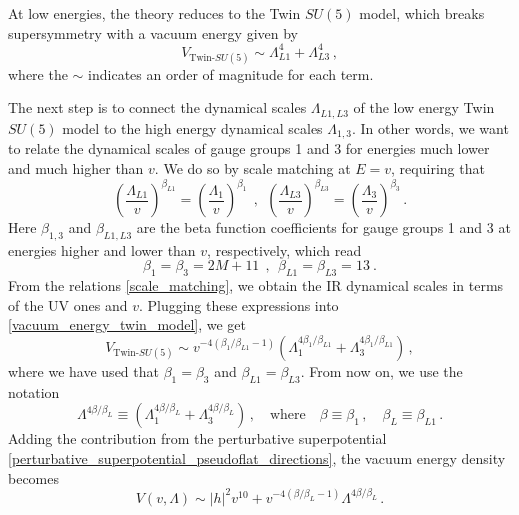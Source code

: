 \documentclass[a4paper,12pt]{article}
\begin{document}
{At low energies, the theory reduces to the Twin $SU(5)$ model, which breaks supersymmetry with a vacuum energy given by 
\begin{equation}
	V_{\text{Twin-}SU(5)} \sim \Lambda_{L1}^4 + \Lambda_{L3}^4 \, ,
\label{vacuum_energy_twin_model}
\end{equation}
where the $\sim$ indicates an order of magnitude for each term.

The next step is to connect the dynamical scales $\Lambda_{L1,L3}$ of the low energy Twin $SU(5)$ model to the high energy dynamical scales 
$\Lambda_{1,3}$. In other words, we want to relate the dynamical scales of gauge groups 1 and 3 for energies much lower and much higher than $v$. We do so by scale matching at $E=v$, requiring that
\begin{equation}
	\left(\frac{\Lambda_{L1}}{v}\right)^{\beta_{L1}} =	\left(\frac{\Lambda_{1}}{v}\right)^{\beta_1} ~~,~~\left(\frac{\Lambda_{L3}}{v}\right)^{\beta_{L3}} =	\left(\frac{\Lambda_{3}}{v}\right)^{\beta_3}  \, .
\label{scale_matching}
\end{equation}
Here $\beta_{1,3}$ and $\beta_{L1,L3}$ are the beta function coefficients for gauge groups 1 and 3 at energies higher and lower than $v$, respectively,  
which read
\begin{equation}
\beta_{1} = \beta_{3} = 2M + 11~~,~~ \beta_{L1} = \beta_{L3} = 13~.
\end{equation}
From the relations \eqref{scale_matching}, we obtain the IR dynamical scales in terms of the UV ones and $v$. Plugging these expressions into \eqref{vacuum_energy_twin_model}, we get
\begin{equation}
	V_{\text{Twin-}SU(5)} \sim v^{-4(\beta_1/\beta_{L1} - 1)}\left(\Lambda^{4\beta_1 / \beta_{L1}}_1 + \Lambda^{4\beta_1 / \beta_{L1}}_3\right)\, ,
\end{equation}
where we have used that $\beta_1=\beta_3$ and $\beta_{L1}=\beta_{L3}$. From now on, we use the notation
\begin{equation}
\Lambda^{4\beta / \beta_{L}} \equiv	\left(\Lambda^{4\beta / \beta_{L}}_1 + \Lambda^{4\beta / \beta_{L}}_3\right) \, , \quad \text{where} \quad \beta \equiv \beta_1 \, , \quad \beta_{L} \equiv \beta_{L1} \, .
\end{equation}
Adding the contribution from the perturbative superpotential \eqref{perturbative_superpotential_pseudoflat_directions}, the vacuum energy density becomes
\begin{equation}
	V(v, \Lambda) \sim \vert h \vert^2 v^{10} +  v^{-4(\beta/\beta_{L} - 1)}\Lambda^{4\beta / \beta_{L}} \, . \label{Eq:EnM}

\end{equation}}
\end{document}
